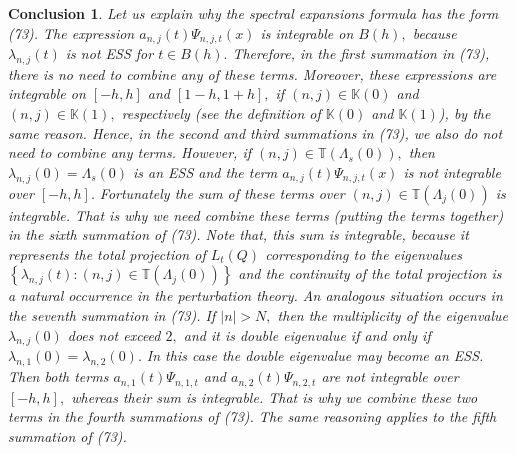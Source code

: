 \documentclass{article}%
\newtheorem{conclusion}{Conclusion}
\begin{document}
\begin{conclusion}
Let us explain why the spectral expansions formula has the form (73). The
expression $a_{n,j}(t)\Psi_{n,j,t}(x)$ is integrable on $B(h),$ because
$\lambda_{n,j}(t)$ is not ESS for $t\in B(h).$ Therefore, in the first
summation in (73), there is no need to combine any of these terms. Moreover,
these expressions are integrable on $[-h,h]$ and $[1-h,1+h],$ if $\left(
n,j\right)  \in\mathbb{K}(0)$ and $\left(  n,j\right)  \in\mathbb{K}(1),$
respectively (see the definition of $\mathbb{K}(0)$ and $\mathbb{K}(1)$), by
the same reason. Hence, in the second and third summations in (73), we also do
not need to combine any terms. However, if $\left(  n,j\right)  \in
\mathbb{T}(\Lambda_{s}(0)),$ then $\lambda_{n,j}(0)=\Lambda_{s}(0)$ is an ESS
and the term $a_{n,j}(t)\Psi_{n,j,t}(x)$ is not integrable over $[-h,h].$
Fortunately the sum of these terms over $\left(  n,j\right)  \in
\mathbb{T}(\Lambda_{j}(0))$ is integrable. That is why we need combine these
terms (putting the terms together) in the sixth summation of (73). Note that,
this sum is integrable, because it represents the total projection of
$L_{t}(Q)$ corresponding to the eigenvalues $\left\{  \lambda_{n,j}(t):\left(
n,j\right)  \in\mathbb{T}(\Lambda_{j}(0))\right\}  $ and the continuity of the
total projection is a natural occurrence in the perturbation theory. An
analogous situation occurs in the seventh summation in (73). If $\left\vert
n\right\vert >N,$ then the multiplicity of the eigenvalue $\lambda_{n,j}(0)$
does not exceed $2,$ and it is double eigenvalue if and only if $\lambda
_{n,1}(0)=\lambda_{n,2}(0).$ In this case the double eigenvalue may become an
ESS. Then both terms $a_{n,1}(t)\Psi_{n,1,t}$ and $a_{n,2}(t)\Psi_{n,2,t}$ are
not integrable over $[-h,h],$ whereas their sum is integrable. That is why we
combine these two terms in the fourth summations of (73). The same reasoning
applies to the fifth summation of (73).
\end{conclusion}
\end{document}
